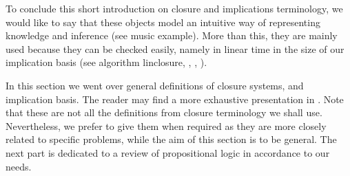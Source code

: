 \vspace{1.2em}

To conclude this short introduction on closure and implications terminology, we 
would like to say that these objects model an intuitive way of representing
knowledge and inference (see music example). More than this, they are mainly 
used because they can be checked easily, namely in linear time in the size of
our implication basis (see algorithm linclosure, \cite{CExp}, \cite{FD}, 
\cite{Maier1980}).

	In this section we went over general definitions of closure systems, and 
implication basis. The reader may find a more exhaustive presentation in 
\cite{CExp, Lat&Ord}. Note that these are not all the definitions from closure 
terminology we shall use. Nevertheless, we prefer to give them when required as 
they are more closely related to specific problems, while the aim of this 
section is to be general. The next part is dedicated to a review of 
propositional logic in accordance to our needs.









